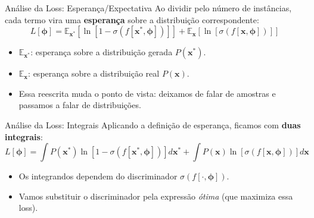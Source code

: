 \documentclass[aspectratio=169,xcolor=dvipsnames]{beamer}
\begin{document}
  \begin{frame}{Análise da Loss: Esperança/Expectativa}
    Ao dividir pelo número de instâncias, cada termo vira uma
    \textbf{esperança} sobre a distribuição correspondente:
    \vspace{0.4em}
    \[
      L[\bm{\phi}] = \mathbb{E}_{\mathbf{x}^{*}}\!\left[\ln\!\left[1-\sigma(f[\mathbf{x}^{*},\bm{\phi}])\right]\right]
      + \mathbb{E}_{\mathbf{x}}\!\left[\ln\!\left[\sigma(f[\mathbf{x},\bm{\phi}])\right]\right]
    \]
    \begin{itemize}
      \item $\mathbb{E}_{\mathbf{x}^*}$: esperança sobre a distribuição gerada
      $P(\mathbf{x}^*)$.
      \item $\mathbb{E}_{\mathbf{x}}$: esperança sobre a distribuição real $P(\mathbf{x})$.
      \item Essa reescrita muda o ponto de vista: deixamos de falar de
      amostras e passamos a falar de distribuições.
    \end{itemize}
  \end{frame}

  \begin{frame}{Análise da Loss: Integrais}
    Aplicando a definição de esperança, ficamos com \textbf{duas
    integrais}:
    \vspace{0.4em}
    \[
      L[\bm{\phi}] = \int P(\mathbf{x}^*) \ln\!\left[1-\sigma(f[\mathbf{x}^{*},\bm{\phi}])\right] d\mathbf{x}^{*}
      + \int P(\mathbf{x}) \ln\!\left[\sigma(f[\mathbf{x},\bm{\phi}])\right] d\mathbf{x}
    \]
    \vspace{0.3em}
    \begin{itemize}
      \item Os integrandos dependem do discriminador $\sigma(f[\cdot,\bm{\phi}])$.
      \item Vamos substituir o discriminador pela expressão \emph{ótima}
      (que maximiza essa loss).
    \end{itemize}
  \end{frame}
\end{document}
